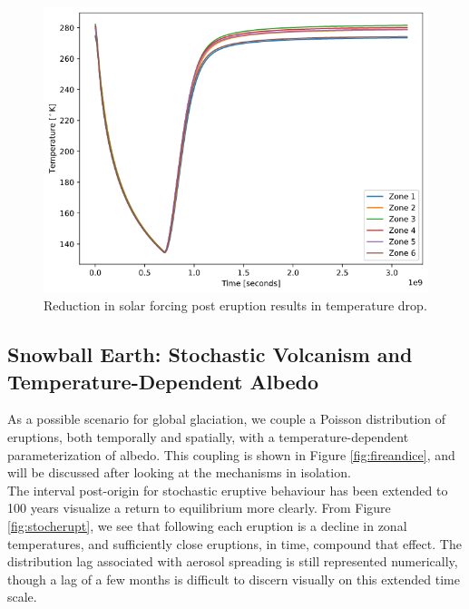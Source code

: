 \documentclass{article}
\begin{document}
\begin{figure}[H]
    \centering
    \includegraphics[scale=0.4]{oneerupt.png}
    \caption{
        Reduction in solar forcing post eruption results in temperature drop.
    }
    \label{fig:oneerupt}
\end{figure}
\FloatBarrier

\subsection{Snowball Earth: Stochastic Volcanism and Temperature-Dependent Albedo}
As a possible scenario for global glaciation, we couple a Poisson distribution
of eruptions, both temporally and spatially, with a temperature-dependent
parameterization of albedo. This coupling is shown in Figure
\ref{fig:fireandice}, and will be discussed after looking at the mechanisms in
isolation. \\

The interval post-origin for stochastic eruptive behaviour has been extended to
100 years visualize a return to equilibrium more clearly. From Figure
\ref{fig:stocherupt}, we see that following each eruption is a decline in zonal
temperatures, and sufficiently close eruptions, in time, compound that effect.
The distribution lag associated with aerosol spreading is still represented
numerically, though a lag of a few months is difficult to discern visually on
this extended time scale. 
\end{document}
